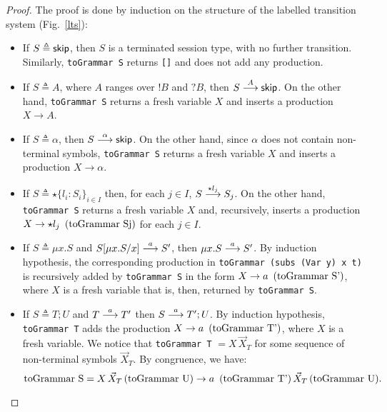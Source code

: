 \begin{proof}
The proof is done by induction on the structure of the labelled 
transition system (Fig.~\ref{lts}):
\begin{itemize}
	\item If $S\triangleq \skipk$, then $S$ is a terminated 
	      session type, with no further transition. Similarly, 
	      \lstinline{toGrammar S} returns \lstinline{[]} and 
	      does not add any production.
	\item If $S\triangleq A$, where $A$ ranges over $!B$ and $?B$, 
	      then $S  \LTSderives[A] \skipk$. On the other hand, 
	      \lstinline{toGrammar S} returns a fresh variable $X$ and 
	      inserts a production $X\rightarrow A$. 
	\item If $S \triangleq \alpha$, then $S   \LTSderives[\alpha] \skipk$. 
	      On the other hand, since $\alpha$ does not contain non-terminal 
	      symbols, \lstinline{toGrammar S} returns a fresh variable $X$ and 
	      inserts a production $X\rightarrow \alpha$.
	\item If $S\triangleq \star\{l_i\colon S_i\}_{i\in I}$ then, for each 
          $j\in I$, $S \LTSderives[\star l_j] S_j$. On the other hand, 
          \lstinline{toGrammar S} returns a fresh variable 
          $X$ and, recursively, inserts a production 
          $X\rightarrow \star l_j \enspace \text{(\lstinline{toGrammar Sj})}$
          for each $j\in I$.
	\item If $S\triangleq \mu x.S$ and $S[\mu x.S/x] \LTSderives[a] S'$, 
	      then $\mu x.S \LTSderives[a] S'$. By induction hypothesis,
	      the corresponding production in \lstinline{toGrammar (subs (Var y) x t)} 
	      is recursively added by \lstinline{toGrammar S} in the form
	      $X \rightarrow a\enspace  \text{(\lstinline{toGrammar S'})}$,
	      where $X$ is a fresh variable that is, then, returned by 
	      \lstinline{toGrammar S}.
	\item If $S\triangleq T;U$ and $T \LTSderives[a] T'$ then $S \LTSderives[a] T';U$. 
	      By induction hypothesis, \lstinline{toGrammar T} adds the production 
	      $X\rightarrow a \enspace \text{(\lstinline{toGrammar T'})}$, where 
	      $X$ is a fresh variable.
		  We notice that \lstinline{toGrammar T} $= X \, \vec X_T$ for some 
		  sequence of non-terminal symbols $\vec X_T$. By congruence, we have: 
		  \[\text{\lstinline{toGrammar S}} = X \, \vec X_T \, \text{(\lstinline{toGrammar U})} 
		  \rightarrow a \enspace \text{(\lstinline{toGrammar T'})} \, \vec X_T  \, 
		  \text{(\lstinline{toGrammar U})} .\]

\end{itemize}
\end{proof}
